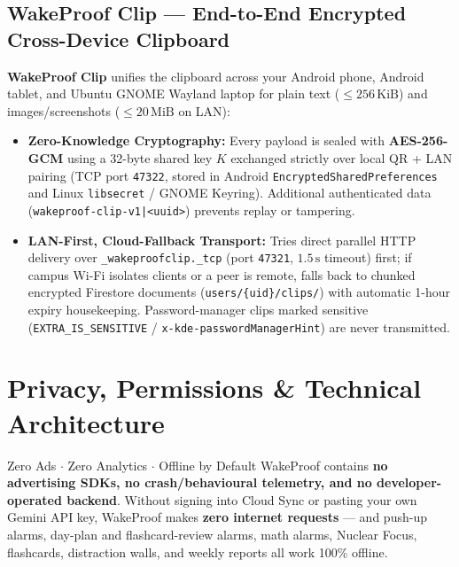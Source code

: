 \documentclass[11pt,a4paper]{article}
\begin{document}
\subsection{WakeProof Clip --- End-to-End Encrypted Cross-Device Clipboard}
\textbf{WakeProof Clip} unifies the clipboard across your Android phone, Android tablet, and Ubuntu GNOME Wayland laptop for plain text ($\le 256\,\text{KiB}$) and images/screenshots ($\le 20\,\text{MiB}$ on LAN):
\begin{itemize}
  \item \textbf{Zero-Knowledge Cryptography:} Every payload is sealed with \textbf{AES-256-GCM} using a 32-byte shared key $K$ exchanged strictly over local QR + LAN pairing (TCP port \texttt{47322}, stored in Android \texttt{EncryptedSharedPreferences} and Linux \texttt{libsecret} / GNOME Keyring). Additional authenticated data (\texttt{wakeproof-clip-v1|<uuid>}) prevents replay or tampering.
  \item \textbf{LAN-First, Cloud-Fallback Transport:} Tries direct parallel HTTP delivery over \texttt{\_wakeproofclip\allowbreak .\_tcp} (port \texttt{47321}, $1.5\,\text{s}$ timeout) first; if campus Wi-Fi isolates clients or a peer is remote, falls back to chunked encrypted Firestore documents (\texttt{users/\{uid\}/clips/}) with automatic 1-hour expiry housekeeping. Password-manager clips marked sensitive (\texttt{EXTRA\_IS\_\allowbreak SENSITIVE} / \texttt{x-kde-password\allowbreak ManagerHint}) are never transmitted.
\end{itemize}

\section{Privacy, Permissions \& Technical Architecture}

\begin{wpbox}[wpteal]{Zero Ads $\cdot$ Zero Analytics $\cdot$ Offline by Default}
WakeProof contains \textbf{no advertising SDKs, no crash/behavioural telemetry, and no developer-operated backend}. Without signing into Cloud Sync or pasting your own Gemini API key, WakeProof makes \textbf{zero internet requests} --- and push-up alarms, day-plan and flashcard-review alarms, math alarms, Nuclear Focus, flashcards, distraction walls, and weekly reports all work 100\% offline.
\end{wpbox}
\end{document}

